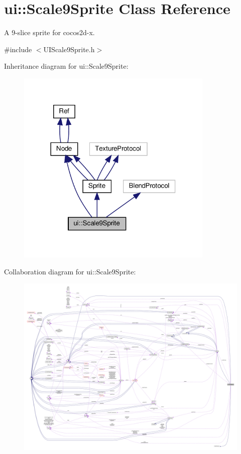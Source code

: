 \hypertarget{classui_1_1Scale9Sprite}{}\section{ui\+:\+:Scale9\+Sprite Class Reference}
\label{classui_1_1Scale9Sprite}


A 9-\/slice sprite for cocos2d-\/x.  




{\ttfamily \#include $<$U\+I\+Scale9\+Sprite.\+h$>$}



Inheritance diagram for ui\+:\+:Scale9\+Sprite\+:
\nopagebreak
\begin{figure}[H]
\begin{center}
\leavevmode
\includegraphics[width=266pt]{classui_1_1Scale9Sprite__inherit__graph}
\end{center}
\end{figure}


Collaboration diagram for ui\+:\+:Scale9\+Sprite\+:
\nopagebreak
\begin{figure}[H]
\begin{center}
\leavevmode
\includegraphics[width=350pt]{classui_1_1Scale9Sprite__coll__graph}
\end{center}
\end{figure}

